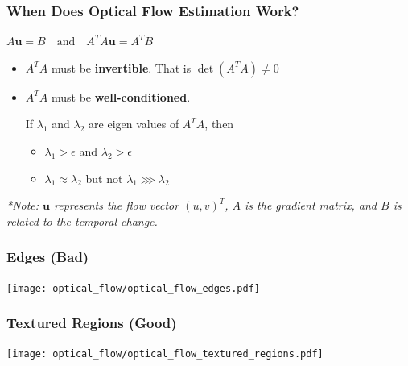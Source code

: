 \begin{frame}
    \frametitle{When Does Optical Flow Estimation Work?}
    
    \begin{center}
        $\boxed{A\mathbf{u} = B} \quad \text{and} \quad \boxed{A^T A\mathbf{u} = A^T B}$
    \end{center}
    
    \vspace{0.5em}
    
    \begin{itemize}
        \item $A^T A$ must be \textbf{invertible}. That is $\det(A^T A) \neq 0$
        \item $A^T A$ must be \textbf{well-conditioned}.
        
        \vspace{0.2em}
        If $\lambda_1$ and $\lambda_2$ are eigen values of $A^T A$, then
        \begin{itemize}
            \item $\lambda_1 > \epsilon$ and $\lambda_2 > \epsilon$
            \item $\lambda_1 \approx \lambda_2$ but not $\lambda_1 \ggg \lambda_2$
        \end{itemize}
    \end{itemize}
    
    \vspace{1em}
    \small{\textit{*Note: $\mathbf{u}$ represents the flow vector $(u, v)^T$, $A$ is the gradient matrix, and $B$ is related to the temporal change.}}
\end{frame}


\begin{frame}
    \frametitle{Edges (Bad)}

  \begin{center}
    \texttt{[image: optical\_flow/optical\_flow\_edges.pdf]}
  \end{center}
    
\end{frame}

\begin{frame}
    \frametitle{Textured Regions (Good)}

  \begin{center}
    \texttt{[image: optical\_flow/optical\_flow\_textured\_regions.pdf]}
  \end{center}
    
\end{frame}

